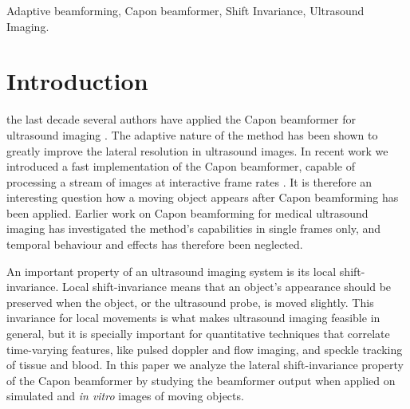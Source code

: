 \documentclass[journal]{IEEEtran}
\begin{document}
\begin{IEEEkeywords}
Adaptive beamforming, Capon beamformer, Shift Invariance, Ultrasound Imaging.
\end{IEEEkeywords}






%
\IEEEpeerreviewmaketitle



\section{Introduction}
% 
% 
% 
% 

 the last decade several authors have applied the Capon beamformer for ultrasound imaging \cite{Synnevag2007, Vignon2008, Viola}. The adaptive nature of the method has been shown to greatly improve the lateral resolution in ultrasound images. In recent work we introduced a fast implementation of the Capon beamformer, capable of processing a stream of images at interactive frame rates \cite{Asen}. It is therefore an interesting question how a moving object appears after Capon beamforming has been applied. Earlier work on Capon beamforming for medical ultrasound imaging has investigated the method's capabilities in single frames only, and temporal behaviour and effects has therefore been neglected. 

An important property of an ultrasound imaging system is its local shift-invariance. Local shift-invariance means that an object's appearance should be preserved when the object, or the ultrasound probe, is moved slightly. This invariance for local movements is what makes ultrasound imaging feasible in general, but it is specially important for quantitative techniques that correlate time-varying features, like pulsed doppler and flow imaging, and speckle tracking of tissue and blood. In this paper we analyze the lateral shift-invariance property of the Capon beamformer by studying the beamformer output when applied on simulated and \textit{in vitro} images of moving objects.
\end{document}
